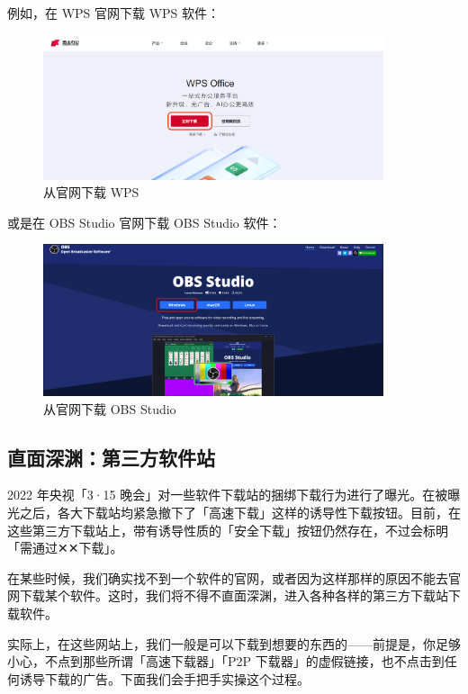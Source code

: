 例如，在 WPS 官网下载 WPS 软件：

\begin{figure}[htb!]
  \centering
  \includegraphics[width=10cm]{assets/basic/Download_WPS.png}
  \caption{从官网下载 WPS}
  \label{fig:Download_WPS}
\end{figure}

或是在 OBS Studio 官网下载 OBS Studio 软件：

\begin{figure}[htb!]
  \centering
  \includegraphics[width=10cm]{assets/basic/OBS.png}
  \caption{从官网下载 OBS Studio}
  \label{fig:OBS}
\end{figure}

\subsection{直面深渊：第三方软件站}

\begin{note}
  2022 年央视「3·15 晚会」对一些软件下载站的捆绑下载行为进行了曝光\footnotemark。在被曝光之后，各大下载站均紧急撤下了「高速下载」这样的诱导性下载按钮。目前，在这些第三方下载站上，带有诱导性质的「安全下载」按钮仍然存在，不过会标明「需通过✕✕下载」。
\end{note}

在某些时候，我们确实找不到一个软件的官网，或者因为这样那样的原因不能去官网下载某个软件。这时，我们将不得不直面深渊，进入各种各样的第三方下载站下载软件。

实际上，在这些网站上，我们一般是可以下载到想要的东西的——前提是，你足够小心，不点到那些所谓「高速下载器」「P2P 下载器」的虚假链接，也不点击到任何诱导下载的广告。下面我们会手把手实操这个过程。

